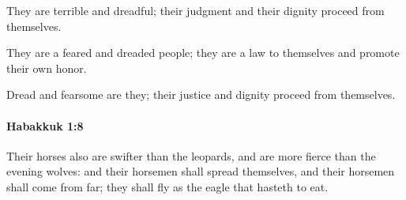 			\begin{versebox}
					\item[BHS] 
					\item[LXX] 
					\item[ASV] They are terrible and dreadful; their judgment and their dignity proceed from themselves.
					\item[NIV] They are a feared and dreaded people; they are a law to themselves and promote their own honor.
					\item[NRSV] Dread and fearsome are they; their justice and dignity proceed from themselves.
			\end{versebox}

		\paragraph{Habakkuk 1:8} %
			\label{HABAKKUK-1-8}

			Their horses also are swifter than the leopards, and are more fierce than the evening wolves: and their horsemen shall spread themselves, and their horsemen shall come from far; they shall fly as the eagle that hasteth to eat.

